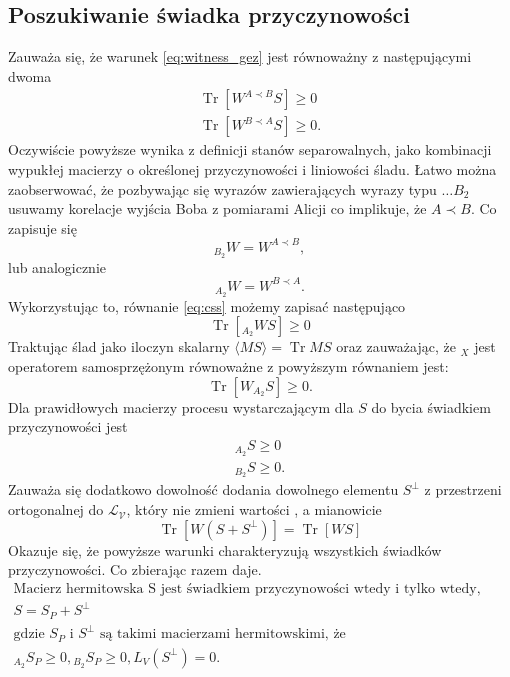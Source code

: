\documentclass[10pt]{article} %
\DeclareMathOperator{\Trs}{Tr}
\begin{document}
\subsection{Poszukiwanie świadka przyczynowości}
Zauważa się, że warunek \eqref{eq:witness_gez} jest równoważny z następującymi dwoma
\begin{gather}
\label{eq:css2}
\Trs \left[ W^{A \prec B} S\right] \geq 0 \\
\label{eq:css}
\Trs \left[ W^{B \prec A} S\right] \geq 0.
\end{gather}
Oczywiście powyższe wynika z definicji stanów separowalnych, jako kombinacji wypukłej macierzy o określonej przyczynowości i liniowości śladu.
Łatwo można zaobserwować, że pozbywając się wyrazów zawierających wyrazy typu $\dots B_2$ usuwamy korelacje wyjścia Boba z pomiarami Alicji co
implikuje, że $A \prec B$. Co zapisuje się
\begin{equation}
{}_{B_2} W = W^{A \prec B},
\end{equation}
lub analogicznie
\begin{equation}
{}_{A_2} W = W^{B \prec A}.
\end{equation}
Wykorzystując to, równanie \eqref{eq:css} możemy zapisać następująco
\begin{equation}
\Trs \left[ {}_{A_2} W S\right] \geq 0
\end{equation}
Traktując ślad jako iloczyn skalarny $\langle M S \rangle = \Trs MS$ oraz zauważając, że ${}_X$ jest operatorem samosprzężonym równoważne z powyższym
równaniem jest:
\begin{equation}
\Trs \left[ W {}_{A_2}S \right] \geq 0.
\end{equation}
Dla prawidłowych macierzy procesu wystarczającym dla $S$ do bycia świadkiem przyczynowości jest 
\begin{gather}
{}_{A_2} S \geq 0 \\
{}_{B_2} S \geq 0.
\end{gather}
Zauważa się dodatkowo dowolność dodania dowolnego elementu $S^\bot$ z przestrzeni ortogonalnej do $\mathcal{L_V}$, który nie zmieni wartości \label{eq:witness_gez}, a mianowicie
\begin{equation}
\Trs\left[W\left(S + S^\bot\right)\right] = \Trs\left[WS\right]
\end{equation}
Okazuje się, że powyższe warunki charakteryzują wszystkich świadków przyczynowości.
Co zbierając razem daje.
\begin{gather}
\text{Macierz hermitowska S jest świadkiem przyczynowości wtedy i tylko wtedy, gdy da się ją zapisać jako} \\
S = S_P + S^\bot \\
\text{gdzie $S_P$ i $S^\bot$ są takimi macierzami hermitowskimi, że} \\ 
{}_{A_2} S_P \geq 0, {}_{B_2} S_P \geq 0, L_V(S^\bot) = 0.
\end{gather}
\end{document}

